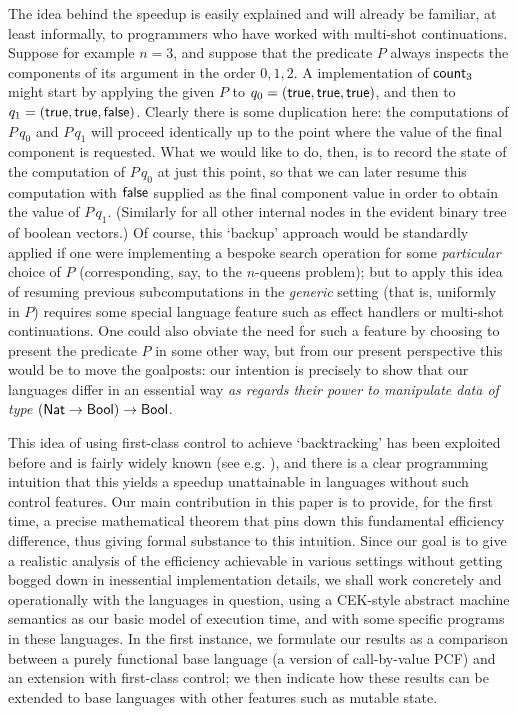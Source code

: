 \documentclass[12pt,phd,lfcs,twoside,openright,logo,leftchapter,normalheadings]{infthesis}
\theoremstyle{plain}
\theoremstyle{definition}
\begin{document}
The idea behind the speedup is easily explained and will already be
familiar, at least informally, to programmers who have worked with
multi-shot continuations.
%
Suppose for example $n=3$, and suppose that the predicate $P$ always
inspects the components of its argument in the order $0,1,2$.
%
A \naive implementation of $\mathsf{count}_3$ might start by applying the given
$P$ to $q_0 = (\mathsf{true},\mathsf{true},\mathsf{true})$, and then to
$q_1 = (\mathsf{true},\mathsf{true},\mathsf{false})$.  Clearly there is some duplication here:
the computations of $P\,q_0$ and $P\,q_1$ will proceed identically up
to the point where the value of the final component is requested. What
we would like to do, then, is to record the state of the computation
of $P\,q_0$ at just this point, so that we can later resume this
computation with $\mathsf{false}$ supplied as the final component value in
order to obtain the value of $P\,q_1$. (Similarly for all other
internal nodes in the evident binary tree of boolean vectors.) Of
course, this `backup' approach would be standardly applied if one were
implementing a bespoke search operation for some \emph{particular}
choice of $P$ (corresponding, say, to the $n$-queens problem); but to
apply this idea of resuming previous subcomputations in the
\emph{generic} setting (that is, uniformly in $P$) requires some
special language feature such as effect handlers or multi-shot
continuations.
%
One could also obviate the need for such a feature by choosing to
present the predicate $P$ in some other way, but from our present
perspective this would be to move the goalposts: our intention is
precisely to show that our languages differ in an essential way
\emph{as regards their power to manipulate data of type} $(\mathsf{Nat} \to
\mathsf{Bool}) \to \mathsf{Bool}$.

This idea of using first-class control to achieve `backtracking' has
been exploited before and is fairly widely known (see
e.g. \citep{KiselyovSFA05}), and there is a clear programming
intuition that this yields a speedup unattainable in languages without
such control features.  Our main contribution in this paper is to
provide, for the first time, a precise mathematical theorem that pins
down this fundamental efficiency difference, thus giving formal
substance to this intuition.  Since our goal is to give a realistic
analysis of the efficiency achievable in various settings without
getting bogged down in inessential implementation details, we shall
work concretely and operationally with the languages in question,
using a CEK-style abstract machine semantics as our basic model of
execution time, and with some specific programs in these languages.
In the first instance, we formulate our results as a comparison
between a purely functional base language (a version of call-by-value
PCF) and an extension with first-class control; we then indicate how
these results can be extended to base languages with other features
such as mutable state.
\end{document}

